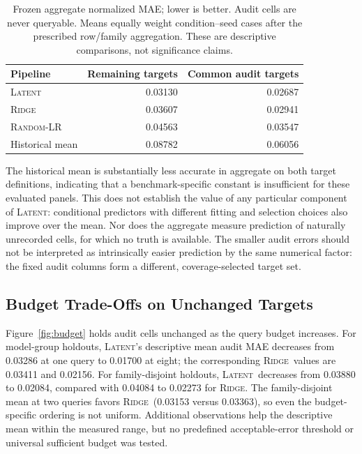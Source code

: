 \documentclass{article}
\newcommand{\latent}{\textsc{Latent}}
\newcommand{\ridge}{\textsc{Ridge}}
\newcommand{\randomlr}{\textsc{Random-LR}}
\begin{document}
\begin{table}[t]
\centering
\caption{Frozen aggregate normalized MAE; lower is better. Audit cells are never queryable. Means equally weight condition--seed cases after the prescribed row/family aggregation. These are descriptive comparisons, not significance claims.}
\label{tab:main}
\begin{tabular}{lrr}
\toprule
Pipeline & Remaining targets & Common audit targets \\
\midrule
\latent & 0.03130 & 0.02687 \\
\ridge & 0.03607 & 0.02941 \\
\randomlr & 0.04563 & 0.03547 \\
Historical mean & 0.08782 & 0.06056 \\
\bottomrule
\end{tabular}
\end{table}

The historical mean is substantially less accurate in aggregate on both target definitions, indicating that a benchmark-specific constant is insufficient for these evaluated panels. This does not establish the value of any particular component of \latent: conditional predictors with different fitting and selection choices also improve over the mean. Nor does the aggregate measure prediction of naturally unrecorded cells, for which no truth is available. The smaller audit errors should not be interpreted as intrinsically easier prediction by the same numerical factor: the fixed audit columns form a different, coverage-selected target set.

\subsection{Budget Trade-Offs on Unchanged Targets}
Figure~\ref{fig:budget} holds audit cells unchanged as the query budget increases. For model-group holdouts, \latent's descriptive mean audit MAE decreases from 0.03286 at one query to 0.01700 at eight; the corresponding \ridge\ values are 0.03411 and 0.02156. For family-disjoint holdouts, \latent\ decreases from 0.03880 to 0.02084, compared with 0.04084 to 0.02273 for \ridge. The family-disjoint mean at two queries favors \ridge\ (0.03153 versus 0.03363), so even the budget-specific ordering is not uniform. Additional observations help the descriptive mean within the measured range, but no predefined acceptable-error threshold or universal sufficient budget was tested.
\end{document}
